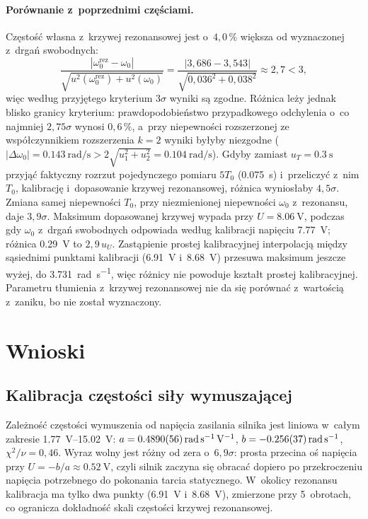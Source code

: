 \documentclass[12pt, a4paper]{article}
\begin{document}
\paragraph{Porównanie z~poprzednimi częściami.}
Częstość własna z~krzywej rezonansowej jest o~$4{,}0\,\%$ większa od wyznaczonej
z~drgań swobodnych:
\begin{equation*}
    \frac{|\omega_0^\text{rez} - \omega_0|}{\sqrt{u^2(\omega_0^\text{rez}) + u^2(\omega_0)}}
    = \frac{|3{,}686 - 3{,}543|}{\sqrt{0{,}036^2 + 0{,}038^2}} \approx 2{,}7 < 3,
\end{equation*}
więc według przyjętego kryterium $3\sigma$ wyniki są zgodne. Różnica leży jednak blisko
granicy kryterium: prawdopodobieństwo przypadkowego odchylenia o~co najmniej $2{,}75\sigma$
wynosi $0{,}6\,\%$, a~przy niepewności rozszerzonej ze współczynnikiem rozszerzenia
$k = 2$ wyniki byłyby niezgodne
($|\Delta\omega_0| = \SI{0.143}{\radian\per\second} > 2\sqrt{u_1^2 + u_2^2} = \SI{0.104}{\radian\per\second}$).
Gdyby zamiast $u_T = \SI{0.3}{\second}$ przyjąć faktyczny rozrzut
pojedynczego pomiaru $5T_0$ (\SI{0.075}{\second}) i~przeliczyć z~nim $T_0$, kalibrację
i~dopasowanie krzywej rezonansowej, różnica wyniosłaby $4{,}5\sigma$. Zmiana samej
niepewności $T_0$, przy niezmienionej niepewności $\omega_0$ z~rezonansu, daje $3{,}9\sigma$.
Maksimum dopasowanej krzywej wypada przy $U = \SI{8.06}{\volt}$, podczas gdy $\omega_0$
z~drgań swobodnych odpowiada według kalibracji napięciu \SI{7.77}{\volt}; różnica
\SI{0.29}{\volt} to $2{,}9\,u_U$. Zastąpienie prostej kalibracyjnej interpolacją między
sąsiednimi punktami kalibracji (\SI{6.91}{\volt} i~\SI{8.68}{\volt}) przesuwa maksimum
jeszcze wyżej, do \SI{3.731}{\radian\per\second}, więc różnicy nie powoduje kształt
prostej kalibracyjnej. Parametru tłumienia z~krzywej rezonansowej nie da się porównać
z~wartością z~zaniku, bo nie został wyznaczony.

\section{Wnioski}

\subsection{Kalibracja częstości siły wymuszającej}

Zależność częstości wymuszenia od napięcia zasilania silnika jest liniowa w~całym
zakresie \SIrange{1.77}{15.02}{\volt}:
$a = \SI{0.4890 \pm 0.0056}{\radian\per\second\per\volt}$,
$b = \SI{-0.256 \pm 0.037}{\radian\per\second}$, $\chi^2/\nu = 0{,}46$. Wyraz wolny
jest różny od zera o~$6{,}9\sigma$: prosta przecina oś napięcia przy
$U = -b/a \approx \SI{0.52}{\volt}$, czyli silnik zaczyna się obracać dopiero po
przekroczeniu napięcia potrzebnego do pokonania tarcia statycznego. W~okolicy
rezonansu kalibracja ma tylko dwa punkty (\SI{6.91}{\volt} i~\SI{8.68}{\volt}),
zmierzone przy 5~obrotach, co ogranicza dokładność skali częstości krzywej
rezonansowej.
\end{document}
